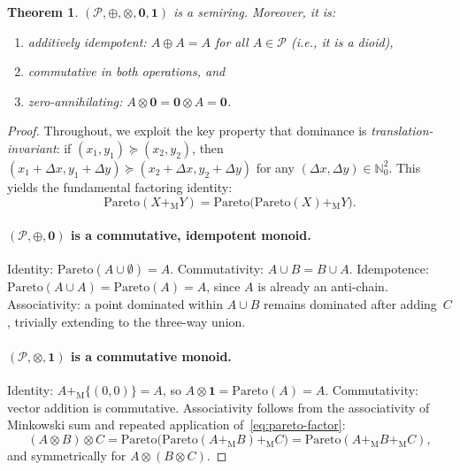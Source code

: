 \documentclass[11pt, letterpaper]{article}
\newtheorem{theorem}{Theorem}
\theoremstyle{definition}
\theoremstyle{remark}
\begin{document}
\begin{theorem}
\label{thm:semiring}
$(\mathcal{P}, \oplus, \otimes, \mathbf{0}, \mathbf{1})$ is a semiring.
Moreover, it is:
\begin{enumerate}[label=(\alph*)]
    \item \emph{additively idempotent}: $A \oplus A = A$ for all $A \in \mathcal{P}$ (i.e., it is a dioid),
    \item \emph{commutative in both operations}, and
    \item \emph{zero-annihilating}: $A \otimes \mathbf{0} = \mathbf{0} \otimes A = \mathbf{0}$.
\end{enumerate}
\end{theorem}

\begin{proof}
Throughout, we exploit the key property that dominance is \emph{translation-invariant}: if $(x_1, y_1) \succcurlyeq (x_2, y_2)$, then $(x_1 + \Delta x, y_1 + \Delta y) \succcurlyeq (x_2 + \Delta x, y_2 + \Delta y)$ for any $(\Delta x, \Delta y) \in \mathbb{N}_0^2$.
This yields the fundamental factoring identity:
\begin{equation}
\label{eq:pareto-factor}
    \mathrm{Pareto}(X +_{\mathrm{M}} Y)
    = \mathrm{Pareto}\!\bigl(\mathrm{Pareto}(X) +_{\mathrm{M}} Y\bigr).
\end{equation}

\paragraph{$(\mathcal{P}, \oplus, \mathbf{0})$ is a commutative, idempotent monoid.}
Identity: $\mathrm{Pareto}(A \cup \emptyset) = A$.
Commutativity: $A \cup B = B \cup A$.
Idempotence: $\mathrm{Pareto}(A \cup A) = \mathrm{Pareto}(A) = A$, since $A$ is already an anti-chain.
Associativity: a point dominated within $A \cup B$ remains dominated after adding~$C$, trivially extending to the three-way union.

\paragraph{$(\mathcal{P}, \otimes, \mathbf{1})$ is a commutative monoid.}
Identity: $A +_{\mathrm{M}} \{(0,0)\} = A$, so $A \otimes \mathbf{1} = \mathrm{Pareto}(A) = A$.
Commutativity: vector addition is commutative.
Associativity follows from the associativity of Minkowski sum and repeated application of~\eqref{eq:pareto-factor}:
\[
    (A \otimes B) \otimes C
    = \mathrm{Pareto}\!\bigl(\mathrm{Pareto}(A +_{\mathrm{M}} B) +_{\mathrm{M}} C\bigr)
    = \mathrm{Pareto}(A +_{\mathrm{M}} B +_{\mathrm{M}} C),
\]
and symmetrically for $A \otimes (B \otimes C)$.


\end{proof}
\end{document}
